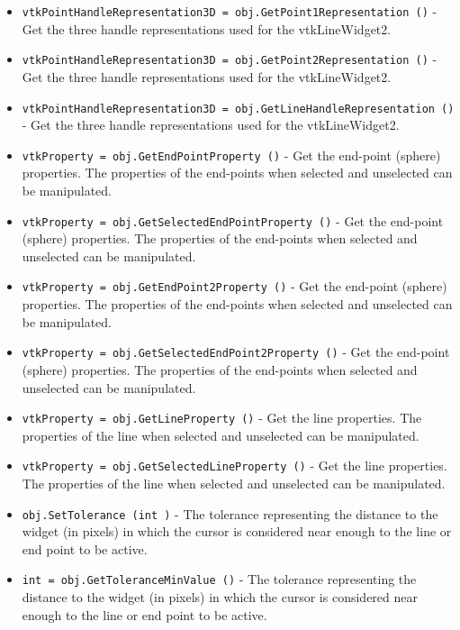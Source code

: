 \begin{itemize}
\item  \verb|vtkPointHandleRepresentation3D = obj.GetPoint1Representation ()| -  Get the three handle representations used for the vtkLineWidget2. 

\item  \verb|vtkPointHandleRepresentation3D = obj.GetPoint2Representation ()| -  Get the three handle representations used for the vtkLineWidget2. 

\item  \verb|vtkPointHandleRepresentation3D = obj.GetLineHandleRepresentation ()| -  Get the three handle representations used for the vtkLineWidget2. 

\item  \verb|vtkProperty = obj.GetEndPointProperty ()| -  Get the end-point (sphere) properties. The properties of the end-points 
 when selected and unselected can be manipulated.

\item  \verb|vtkProperty = obj.GetSelectedEndPointProperty ()| -  Get the end-point (sphere) properties. The properties of the end-points 
 when selected and unselected can be manipulated.

\item  \verb|vtkProperty = obj.GetEndPoint2Property ()| -  Get the end-point (sphere) properties. The properties of the end-points 
 when selected and unselected can be manipulated.

\item  \verb|vtkProperty = obj.GetSelectedEndPoint2Property ()| -  Get the end-point (sphere) properties. The properties of the end-points 
 when selected and unselected can be manipulated.

\item  \verb|vtkProperty = obj.GetLineProperty ()| -  Get the line properties. The properties of the line when selected
 and unselected can be manipulated.

\item  \verb|vtkProperty = obj.GetSelectedLineProperty ()| -  Get the line properties. The properties of the line when selected
 and unselected can be manipulated.

\item  \verb|obj.SetTolerance (int )| -  The tolerance representing the distance to the widget (in pixels) in
 which the cursor is considered near enough to the line or end point 
 to be active.

\item  \verb|int = obj.GetToleranceMinValue ()| -  The tolerance representing the distance to the widget (in pixels) in
 which the cursor is considered near enough to the line or end point 
 to be active.


\end{itemize}
